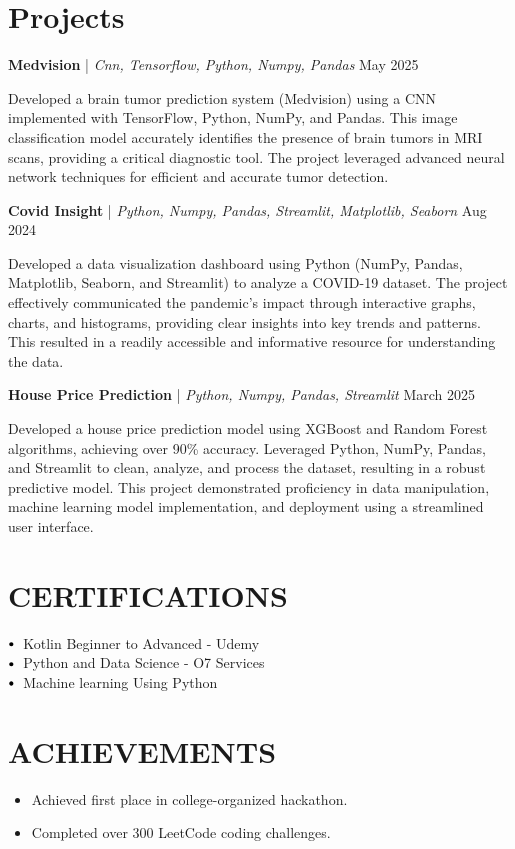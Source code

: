 \documentclass[letterpaper,11pt]{article}
\newcommand\sbullet[1][.5]{\mathbin{\vcenter{\hbox{\scalebox{#1}{$\bullet$}}}}}
\begin{document}
\section*{Projects}
\textbf{Medvision} \href{https://github.com/Priyanshu98156}{\faExternalLink} | \textit{Cnn, Tensorflow, Python, Numpy, Pandas} \hfill May 2025 \\[2pt]
\begin{adjustwidth}{0.5cm}{0cm}
Developed a brain tumor prediction system (Medvision) using a CNN implemented with TensorFlow, Python, NumPy, and Pandas.  This image classification model accurately identifies the presence of brain tumors in MRI scans, providing a critical diagnostic tool.  The project leveraged advanced neural network techniques for efficient and accurate tumor detection.
\end{adjustwidth}
\vspace{6pt}
\textbf{Covid Insight} \href{https://github.com/Priyanshu98156}{\faExternalLink} | \textit{Python, Numpy, Pandas, Streamlit,  Matplotlib, Seaborn} \hfill Aug 2024 \\[2pt]
\begin{adjustwidth}{0.5cm}{0cm}
Developed a data visualization dashboard using Python (NumPy, Pandas, Matplotlib, Seaborn, and Streamlit) to analyze a COVID-19 dataset.  The project effectively communicated the pandemic's impact through interactive graphs, charts, and histograms, providing clear insights into key trends and patterns. This resulted in a readily accessible and informative resource for understanding the data.
\end{adjustwidth}
\vspace{6pt}
\textbf{House Price Prediction} \href{https://github.com/Priyanshu98156}{\faExternalLink} | \textit{Python, Numpy, Pandas, Streamlit} \hfill March 2025 \\[2pt]
\begin{adjustwidth}{0.5cm}{0cm}
Developed a house price prediction model using XGBoost and Random Forest algorithms, achieving over 90\% accuracy.  Leveraged Python, NumPy, Pandas, and Streamlit to clean, analyze, and process the dataset, resulting in a robust predictive model. This project demonstrated proficiency in data manipulation, machine learning model implementation, and deployment using a streamlined user interface.
\end{adjustwidth}
\vspace{6pt}


\section{CERTIFICATIONS}
$\sbullet[.75] \hspace{0.1cm}$ Kotlin Beginner to Advanced - Udemy \\
$\sbullet[.75] \hspace{0.1cm}$ Python and Data Science - O7 Services \\
$\sbullet[.75] \hspace{0.1cm}$ Machine learning Using Python \\

\section{ACHIEVEMENTS}
\begin{itemize}[leftmargin=*]
\item Achieved first place in college-organized hackathon.
\item Completed over 300 LeetCode coding challenges.
\end{itemize}
\end{document}
